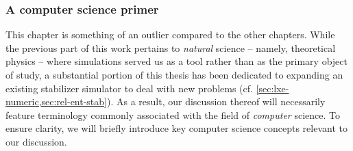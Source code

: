 \subsubsection*{A computer science primer}
This chapter is something of an outlier compared to the other chapters. While
the previous part of this work pertains to \emph{natural} science -- namely,
theoretical physics -- where simulations served us as a tool rather than as the
primary object of study, a substantial portion of this thesis has been
dedicated to expanding an existing stabilizer simulator to deal with new
problems (cf.  \cref{sec:lxe-numeric,sec:rel-ent-stab}). As a result, our
discussion thereof will necessarily feature
terminology commonly associated with the field of \emph{computer} science.
To ensure clarity, we will briefly introduce key computer science concepts
relevant to our discussion.  

